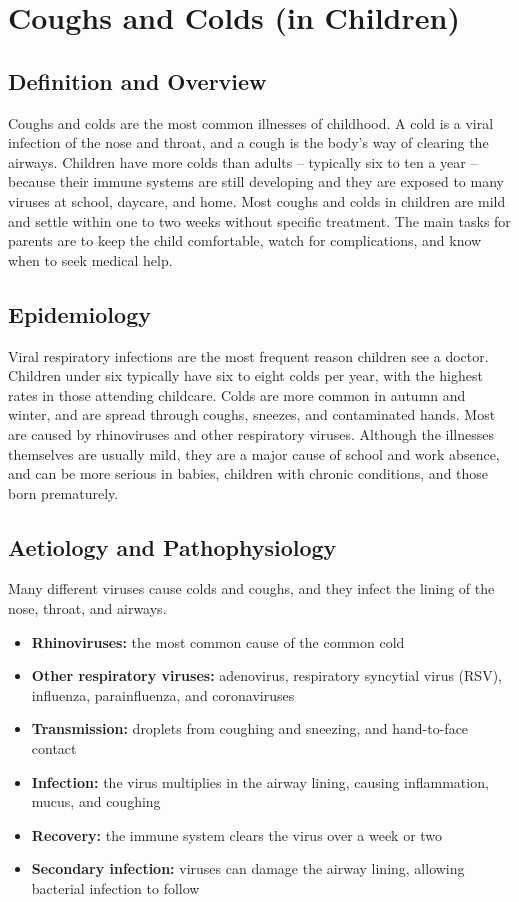 \chapter{Coughs and Colds (in Children)}

\section*{Definition and Overview}
Coughs and colds are the most common illnesses of childhood. A cold is a viral infection of the nose and throat, and a cough is the body's way of clearing the airways. Children have more colds than adults -- typically six to ten a year -- because their immune systems are still developing and they are exposed to many viruses at school, daycare, and home. Most coughs and colds in children are mild and settle within one to two weeks without specific treatment. The main tasks for parents are to keep the child comfortable, watch for complications, and know when to seek medical help.

\section*{Epidemiology}
Viral respiratory infections are the most frequent reason children see a doctor. Children under six typically have six to eight colds per year, with the highest rates in those attending childcare. Colds are more common in autumn and winter, and are spread through coughs, sneezes, and contaminated hands. Most are caused by rhinoviruses and other respiratory viruses. Although the illnesses themselves are usually mild, they are a major cause of school and work absence, and can be more serious in babies, children with chronic conditions, and those born prematurely.

\section*{Aetiology and Pathophysiology}
Many different viruses cause colds and coughs, and they infect the lining of the nose, throat, and airways.

\begin{itemize}
    \item \textbf{Rhinoviruses:} the most common cause of the common cold
    \item \textbf{Other respiratory viruses:} adenovirus, respiratory syncytial virus (RSV), influenza, parainfluenza, and coronaviruses
    \item \textbf{Transmission:} droplets from coughing and sneezing, and hand-to-face contact
    \item \textbf{Infection:} the virus multiplies in the airway lining, causing inflammation, mucus, and coughing
    \item \textbf{Recovery:} the immune system clears the virus over a week or two
    \item \textbf{Secondary infection:} viruses can damage the airway lining, allowing bacterial infection to follow
\end{itemize}


